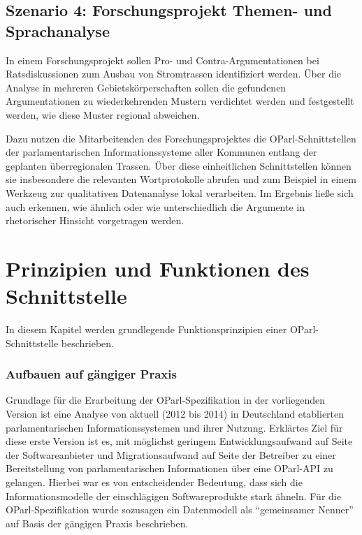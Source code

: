 \documentclass[,a4paper]{article}
\begin{document}
\subsection{Szenario 4: Forschungsprojekt Themen- und
Sprachanalyse}\label{szenarioux5fforschung}

In einem Forschungsprojekt sollen Pro- und Contra-Argumentationen bei
Ratsdiskussionen zum Ausbau von Stromtrassen identifiziert werden. Über
die Analyse in mehreren Gebietskörperschaften sollen die gefundenen
Argumentationen zu wiederkehrenden Mustern verdichtet werden und
festgestellt werden, wie diese Muster regional abweichen.

Dazu nutzen die Mitarbeitenden des Forschungsprojektes die
OParl-Schnittstellen der parlamentarischen Informationssysteme aller
Kommunen entlang der geplanten überregionalen Trassen. Über diese
einheitlichen Schnittstellen können sie insbesondere die relevanten
Wortprotokolle abrufen und zum Beispiel in einem Werkzeug zur
qualitativen Datenanalyse lokal verarbeiten. Im Ergebnis ließe sich auch
erkennen, wie ähnlich oder wie unterschiedlich die Argumente in
rhetorischer Hinsicht vorgetragen werden.

\section{Prinzipien und Funktionen des
Schnittstelle}\label{prinzipien-und-funktionen-des-schnittstelle}

In diesem Kapitel werden grundlegende Funktionsprinzipien einer
OParl-Schnittstelle beschrieben.


\subsubsection{Aufbauen auf gängiger
Praxis}\label{aufbauen-auf-guxe4ngiger-praxis}

Grundlage für die Erarbeitung der OParl-Spezifikation in der
vorliegenden Version ist eine Analyse von aktuell (2012 bis 2014) in
Deutschland etablierten parlamentarischen Informationssystemen und ihrer
Nutzung. Erklärtes Ziel für diese erste Version ist es, mit möglichst
geringem Entwicklungsaufwand auf Seite der Softwareanbieter und
Migrationsaufwand auf Seite der Betreiber zu einer Bereitstellung von
parlamentarischen Informationen über eine OParl-API zu gelangen. Hierbei
war es von entscheidender Bedeutung, dass sich die Informationsmodelle
der einschlägigen Softwareprodukte stark ähneln. Für die
OParl-Spezifikation wurde sozusagen ein Datenmodell als ``gemeinsamer
Nenner'' auf Basis der gängigen Praxis beschrieben.
\end{document}
